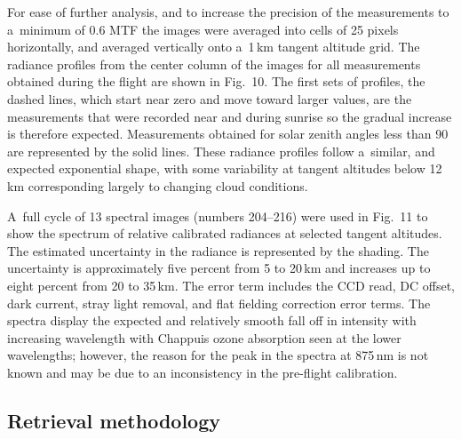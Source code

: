 \documentclass[amtd, online, hvmath]{copernicus}
\begin{document}
For ease of further analysis, and to increase the precision of the
measurements to a~minimum of 0.6 MTF the images were averaged into
cells of 25 pixels horizontally, and averaged vertically onto
a~1\,\unit{km} tangent altitude grid. The radiance profiles from the
center column of the images for all measurements obtained during the
flight are shown in Fig.~10. The first sets of profiles, the dashed
lines, which start near zero and move toward larger values, are the
measurements that were recorded near and during sunrise so the gradual
increase is therefore expected. Measurements obtained for solar zenith
angles less than 90{\degree} are represented by the solid lines. These
radiance profiles follow a~similar, and expected exponential shape,
with some variability at tangent altitudes below 12\,\unit{km}
corresponding largely to changing cloud conditions.

A~full cycle of 13 spectral images (numbers 204--216) were used in Fig.~11 to
show the spectrum of relative calibrated radiances at selected tangent
altitudes. The estimated uncertainty in the radiance is represented by the
shading. The uncertainty is approximately five percent from 5 to
20\,\unit{km} and increases up to eight percent from 20 to 35\,\unit{km}. The
error term includes the CCD read, DC offset, dark current, stray light
removal, and flat fielding correction error terms. The spectra display the
expected and relatively smooth fall off in intensity with increasing
wavelength with Chappuis ozone absorption seen at the lower wavelengths;
however, the reason for the peak in the spectra at 875\,\unit{nm} is not
known and may be due to an inconsistency in the pre-flight calibration.

\subsection{Retrieval methodology}
\end{document}
